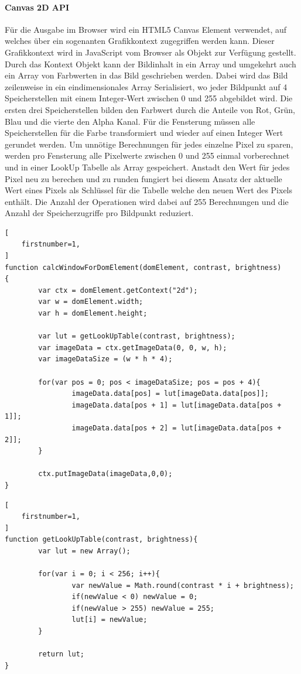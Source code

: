 \paragraph{Canvas 2D API}
Für die Ausgabe im Browser wird ein HTML5 Canvas Element verwendet,
auf welches über ein sogenanten Grafikkontext zugegriffen werden kann. 
Dieser Grafikkontext wird in JavaScript vom Browser als Objekt zur Verfügung gestellt.
Durch das Kontext Objekt kann der Bildinhalt in ein Array und umgekehrt auch ein Array von Farbwerten in das Bild geschrieben werden.
Dabei wird das Bild zeilenweise in ein eindimensionales Array Serialisiert, 
wo jeder Bildpunkt auf 4 Speicherstellen mit einem Integer-Wert zwischen 0 und 255 abgebildet wird.
Die ersten drei Speicherstellen bilden den Farbwert durch die Anteile von Rot, Grün, Blau und die vierte den Alpha Kanal.
Für die Fensterung müssen alle Speicherstellen für die Farbe transformiert und wieder auf einen Integer Wert gerundet werden.
%
Um unnötige Berechnungen für jedes einzelne Pixel zu sparen, werden pro Fensterung alle Pixelwerte zwischen 0 und 255 einmal vorberechnet und in einer LookUp Tabelle als Array gespeichert.
Anstadt den Wert für jedes Pixel neu zu berechen und zu runden fungiert bei diesem Ansatz der aktuelle Wert eines Pixels als Schlüssel für die Tabelle welche den neuen Wert des Pixels enthält.
Die Anzahl der Operationen wird dabei auf 255 Berechnungen und die Anzahl der Speicherzugriffe pro Bildpunkt reduziert.
\begin{lstlisting}[
	firstnumber=1,
]
function calcWindowForDomElement(domElement, contrast, brightness)
{
        var ctx = domElement.getContext("2d");
        var w = domElement.width;
        var h = domElement.height;

        var lut = getLookUpTable(contrast, brightness);
        var imageData = ctx.getImageData(0, 0, w, h);
        var imageDataSize = (w * h * 4);

        for(var pos = 0; pos < imageDataSize; pos = pos + 4){
                imageData.data[pos] = lut[imageData.data[pos]];
                imageData.data[pos + 1] = lut[imageData.data[pos + 1]];
                imageData.data[pos + 2] = lut[imageData.data[pos + 2]];
        }

        ctx.putImageData(imageData,0,0);
}
\end{lstlisting}
\begin{lstlisting}[
	firstnumber=1,
]
function getLookUpTable(contrast, brightness){
        var lut = new Array();

        for(var i = 0; i < 256; i++){
                var newValue = Math.round(contrast * i + brightness);
                if(newValue < 0) newValue = 0;
                if(newValue > 255) newValue = 255;
                lut[i] = newValue;
        }

        return lut;
}
\end{lstlisting}



